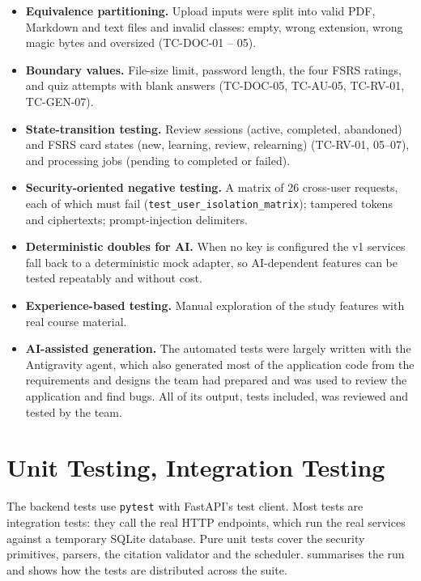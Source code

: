 \begin{itemize}
  \item \textbf{Equivalence partitioning.} Upload inputs were split into valid PDF, Markdown and text files and
  invalid classes: empty, wrong extension, wrong magic bytes and oversized (TC-DOC-01 -- 05).
  \item \textbf{Boundary values.} File-size limit, password length, the four FSRS ratings, and quiz attempts with
  blank answers (TC-DOC-05, TC-AU-05, TC-RV-01, TC-GEN-07).
  \item \textbf{State-transition testing.} Review sessions (active, completed, abandoned) and FSRS card states
  (new, learning, review, relearning) (TC-RV-01, 05--07), and processing jobs (pending to completed or failed).
  \item \textbf{Security-oriented negative testing.} A matrix of 26 cross-user requests, each of which must fail
  (\texttt{test\_user\_isolation\_matrix}); tampered tokens and ciphertexts; prompt-injection delimiters.
  \item \textbf{Deterministic doubles for AI.} When no key is configured the v1 services fall back to a
  deterministic mock adapter, so AI-dependent features can be tested repeatably and without cost.
  \item \textbf{Experience-based testing.} Manual exploration of the study features with real course material.
  \item \textbf{AI-assisted generation.} The automated tests were largely written with the Antigravity agent,
  which also generated most of the application code from the requirements and designs the team had prepared and
  was used to review the application and find bugs. All of its output, tests included, was reviewed and tested by
  the team.
\end{itemize}

\section{Unit Testing, Integration Testing}

The backend tests use \texttt{pytest} with FastAPI's test client. Most tests are integration tests: they call the
real HTTP endpoints, which run the real services against a temporary SQLite database. Pure unit tests cover the
security primitives, parsers, the citation validator and the scheduler.  summarises the run and
 shows how the tests are distributed across the suite.

